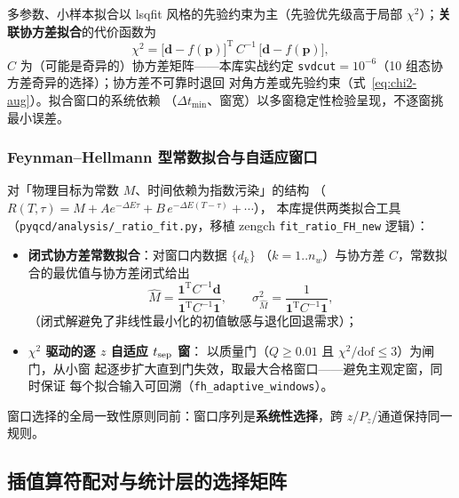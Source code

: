 \documentclass[11pt,a4paper]{ctexart}
\newcommand{\code}[1]{\texttt{#1}}
\begin{document}
多参数、小样本拟合以 lsqfit 风格的先验约束为主（先验优先级高于局部
$\chi^2$）；\textbf{关联协方差拟合}的代价函数为
\begin{equation}
\chi^2 = \bigl[\mathbf d-f(\mathbf p)\bigr]^{\mathrm T}\,
C^{-1}\,\bigl[\mathbf d-f(\mathbf p)\bigr],
\end{equation}
$C$ 为（可能是奇异的）协方差矩阵——本库实战约定
\code{svdcut}$=10^{-6}$（10 组态协方差奇异的选择）；协方差不可靠时退回
对角方差或先验约束（式~\eqref{eq:chi2-aug}）。拟合窗口的系统依赖
（$\Delta t_{\min}$、窗宽）以多窗稳定性检验呈现，不逐窗挑最小误差。

\subsubsection{Feynman--Hellmann 型常数拟合与自适应窗口}

对「物理目标为常数 $M$、时间依赖为指数污染」的结构
（$R(T,\tau)=M+ Ae^{-\Delta E\tau}+B\,e^{-\Delta E(T-\tau)}+\cdots$），
本库提供两类拟合工具（\code{pyqcd/analysis/\_ratio\_fit.py}，移植
zengch \code{fit\_ratio\_FH\_new} 逻辑）：
\begin{itemize}
  \item \textbf{闭式协方差常数拟合}：对窗口内数据 $\{d_k\}$
  （$k=1..n_w$）与协方差 $C$，常数拟合的最优值与协方差闭式给出
  \begin{equation}\label{eq:fh-closed-form}
  \hat M = \frac{\mathbf 1^{\mathrm T} C^{-1}\mathbf d}
  {\mathbf 1^{\mathrm T} C^{-1}\mathbf 1}, \qquad
  \sigma^2_{\hat M} = \frac{1}{\mathbf 1^{\mathrm T} C^{-1}\mathbf 1},
  \end{equation}
  （闭式解避免了非线性最小化的初值敏感与退化回退需求）；
  \item \textbf{$\chi^2$ 驱动的逐 $z$ 自适应 $t_{\rm sep}$ 窗}：
  以质量门（$Q\ge0.01$ 且 $\chi^2/\mathrm{dof}\le3$）为闸门，从小窗
  起逐步扩大直到门失效，取最大合格窗口——避免主观定窗，同时保证
  每个拟合输入可回溯（\code{fh\_adaptive\_windows}）。
\end{itemize}
窗口选择的全局一致性原则同前：窗口序列是\textbf{系统性选择}，跨
$z$/$P_z$/通道保持同一规则。

\subsection{插值算符配对与统计层的选择矩阵}
\end{document}
